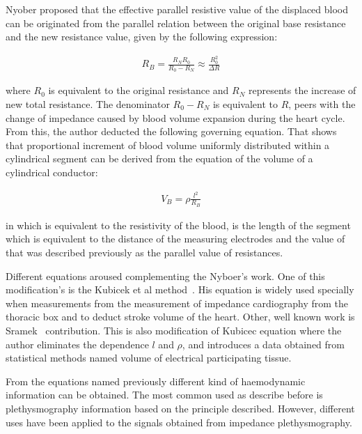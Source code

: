 Nyober proposed that the effective parallel resistive value of the displaced blood can be originated from the parallel relation between the original base resistance and the new resistance value, given by the following expression:

\begin{align}
R_B=\frac{R_N R_0}{R_0-R_N} \approx \frac{R^2_0}{\Delta R}
\end{align}

where $R_0$ is equivalent to the original resistance and $R_N$ represents the increase of new total resistance. The denominator $R_0 - R_N$ is equivalent to $R$, peers with the change of impedance caused by blood volume expansion during the heart cycle. From this, the author deducted the following governing equation. That shows that proportional increment of blood volume uniformly distributed within a cylindrical segment can be derived from the equation of the volume of a cylindrical conductor:

\begin{align}
V_B = \rho \frac{l^2}{R_B}
\end{align}

in which  is equivalent to the resistivity of the blood, is the length of the segment which is equivalent to the distance of the measuring electrodes and the value of  that was described previously as the parallel value of resistances.

Different equations aroused complementing the Nyboer's work. One of this modification's is the Kubicek et al method~\cite{karnegis1966development}. His equation is widely used specially when measurements from the measurement of impedance cardiography from the thoracic box and to deduct stroke volume of the heart. Other, well known work is Sramek~\cite{sramek1986bomed} contribution. This is also modification of Kubicec equation where the author eliminates the dependence $l$ and $\rho$,  and introduces a data obtained from statistical methods named volume of electrical participating tissue. 

From the equations named previously different kind of haemodynamic information can be obtained. The most common used as describe before is plethysmography information based on the principle described. However, different uses have been applied to the signals obtained from impedance plethysmography. 

